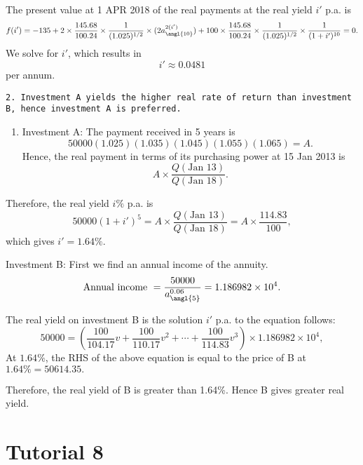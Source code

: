 \documentclass[
]{article}
\providecommand{\tightlist}{%
  \setlength{\itemsep}{0pt}\setlength{\parskip}{0pt}}
\theoremstyle{definition}
\theoremstyle{definition}
\theoremstyle{definition}
\theoremstyle{definition}
\theoremstyle{remark}
\begin{document}
The present value at 1 APR 2018 of the real payments at the real yield \(i'\) p.a. is
\[ f(i') = -135 + 2 \times \frac{145.68  }{100.24} \times \frac{1}{ (1.025)^{1/2}} \times(2 a^{2(i')}_{\angl{10}}) + 100 \times \frac{145.68  }{100.24} \times \frac{1}{ (1.025)^{1/2}} \times \frac{1}{(1+i')^{10}} = 0.\]
We solve for \(i'\), which results in
\[i' \approx 0.0481\] per annum.

\begin{verbatim}
2. Investment A yields the higher real rate of return than investment B, hence investment A is preferred. 
\end{verbatim}

\begin{enumerate}
\def\labelenumi{\arabic{enumi}.}
\setcounter{enumi}{4}
\tightlist
\item
  Investment A: The payment received in 5 years is
  \[50000(1.025)(1.035)(1.045)(1.055)(1.065) = A.\]
  Hence, the real payment in terms of its purchasing power at 15 Jan 2013 is
  \[ A \times \frac{Q(\text{Jan 13})}{Q(\text{Jan 18})}.\]
\end{enumerate}

Therefore, the real yield \(i\%\) p.a. is
\[50000 (1 + i')^5 = A \times \frac{Q(\text{Jan 13})}{Q(\text{Jan 18})} = A \times \frac{114.83}{100},\]
which gives \(i' = 1.64\%.\)

Investment B: First we find an annual income of the annuity.
\[\text{Annual income } = \frac{50000}{a^{0.06}_{\angl{5}}} = \ensuremath{1.186982\times 10^{4}}.\]

The real yield on investment B is the solution
\(i'\) p.a. to the equation
follows:
\[50000 = \left( \frac{100}{104.17} v  + \frac{100}{110.17} v^2 +  \cdots + \frac{100}{114.83}v^3  \right)\times \ensuremath{1.186982\times 10^{4}},\]
At \(1.64\%\), the RHS of the above equation is equal to the price of B at \(1.64\% = 50614.35.\)

Therefore, the real yield of B is greater than 1.64\%. Hence B gives greater real yield.

\hypertarget{tutorial-8}{%
\section{Tutorial 8}\label{tutorial-8}}
\end{document}
